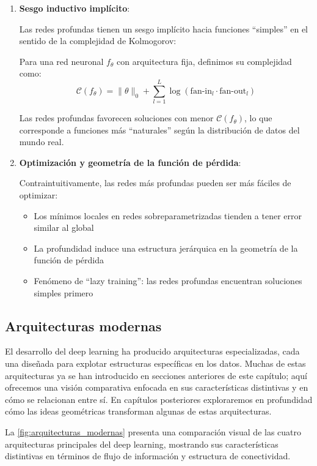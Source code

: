 \begin{enumerate}
	\item \textbf{Sesgo inductivo implícito}:

	Las redes profundas tienen un sesgo implícito hacia funciones ``simples'' en el sentido de la complejidad de Kolmogorov:

	\begin{definition}\label{def:complejidad_funcion}
		Para una red neuronal \(f_\theta\) con arquitectura fija, definimos su complejidad como:
		\[
			\mathcal{C}(f_\theta) = \|\theta\|_0 + \sum_{l=1}^L \log(\text{fan-in}_l \cdot \text{fan-out}_l)
		\]
	\end{definition}

	Las redes profundas favorecen soluciones con menor \(\mathcal{C}(f_\theta)\), lo que corresponde a funciones más ``naturales'' según la distribución de datos del mundo real.

	\item \textbf{Optimización y geometría de la función de pérdida}:

	Contraintuitivamente, las redes más profundas pueden ser más fáciles de optimizar:

	\begin{itemize}
		\item Los mínimos locales en redes sobreparametrizadas tienden a tener error similar al global
		\item La profundidad induce una estructura jerárquica en la geometría de la función de pérdida
		\item Fenómeno de ``lazy training'': las redes profundas encuentran soluciones simples primero
	\end{itemize}
\end{enumerate}

\subsection{Arquitecturas modernas}

El desarrollo del deep learning ha producido arquitecturas especializadas, cada una diseñada para explotar estructuras específicas en los datos. Muchas de estas arquitecturas ya se han introducido en secciones anteriores de este capítulo; aquí ofrecemos una visión comparativa enfocada en sus características distintivas y en cómo se relacionan entre sí. En capítulos posteriores exploraremos en profundidad cómo las ideas geométricas transforman algunas de estas arquitecturas.

La \autoref{fig:arquitecturas_modernas} presenta una comparación visual de las cuatro arquitecturas principales del deep learning, mostrando sus características distintivas en términos de flujo de información y estructura de conectividad.

